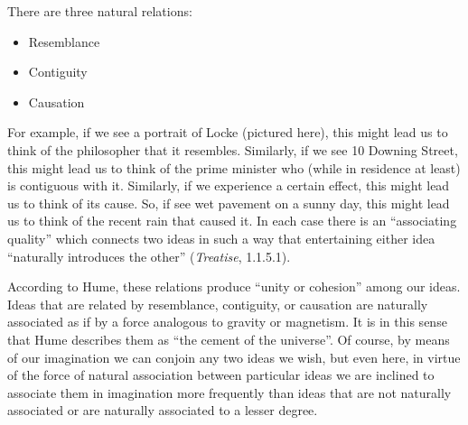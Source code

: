 There are three natural relations:

\begin{itemize}
    \item Resemblance
    \item Contiguity
    \item Causation
\end{itemize}

For example, if we see a portrait of Locke (pictured here), this might lead us to think of the philosopher that it resembles. Similarly, if we see 10 Downing Street, this might lead us to think of the prime minister who (while in residence at least) is contiguous with it. Similarly, if we experience a certain effect, this might lead us to think of its cause. So, if see wet pavement on a sunny day, this might lead us to think of the recent rain that caused it. In each case there is an ``associating quality'' which connects two ideas in such a way that entertaining either idea ``naturally introduces the other'' (\emph{Treatise}, 1.1.5.1).

According to Hume, these relations produce ``unity or cohesion'' among our ideas. Ideas that are related by resemblance, contiguity, or causation are naturally associated as if by a force analogous to gravity or magnetism. It is in this sense that Hume describes them as ``the cement of the universe''. Of course, by means of our imagination we can conjoin any two ideas we wish, but even here, in virtue of the force of natural association between particular ideas we are inclined to associate them in imagination more frequently than ideas that are not naturally associated or are naturally associated to a lesser degree. \change

% 

